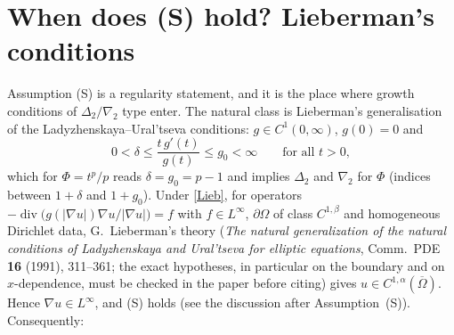 \documentclass[11pt]{amsart}
\theoremstyle{remark}
\theoremstyle{definition}
\begin{document}
\section{When does (S) hold? Lieberman's conditions}\label{sec.lieberman}
Assumption (S) is a regularity statement, and it is the place where growth conditions of $\Delta_2/\nabla_2$ type enter. The natural class is Lieberman's generalisation of the Ladyzhenskaya--Ural'tseva conditions: $g\in C^1(0,\infty)$, $g(0)=0$ and
\begin{equation}\label{Lieb}
0<\delta\le\frac{t\,g'(t)}{g(t)}\le g_0<\infty\qquad\text{for all }t>0 ,
\end{equation}
which for $\Phi=t^p/p$ reads $\delta=g_0=p-1$ and implies $\Delta_2$ and $\nabla_2$ for $\Phi$ (indices between $1+\delta$ and $1+g_0$). Under \eqref{Lieb}, for operators $-\operatorname{div}\big(g(|\nabla u|)\nabla u/|\nabla u|\big)=f$ with $f\in L^\infty$, $\partial\Omega$ of class $C^{1,\beta}$ and homogeneous Dirichlet data, G.~Lieberman's theory (\emph{The natural generalization of the natural conditions of Ladyzhenskaya and Ural'tseva for elliptic equations}, Comm.\ PDE \textbf{16} (1991), 311--361; the exact hypotheses, in particular on the boundary and on $x$-dependence, must be checked in the paper before citing) gives $u\in C^{1,\alpha}(\overline\Omega)$. Hence $\nabla u\in L^\infty$, and (S) holds (see the discussion after Assumption~(S)). Consequently:
\end{document}
